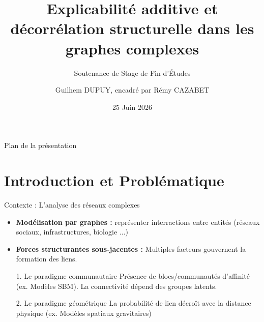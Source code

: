 \documentclass[10pt]{beamer}
\title[Explicabilité et décorrélation dans les graphes]{Explicabilité additive et décorrélation structurelle dans les graphes complexes}
\subtitle{Soutenance de Stage de Fin d'Études}
\author[Guilhem DUPUY]{Guilhem DUPUY, encadré par Rémy CAZABET}
\institute[LIRIS - équipe DM2L]{Université Lyon 1, LIRIS - équipe DM2L}
\date{25 Juin 2026}
\begin{document}
\begin{frame}
    \titlepage
\end{frame}

\begin{frame}{Plan de la présentation}
    \tableofcontents
\end{frame}

\section{Introduction et Problématique}

\begin{frame}{Contexte : L'analyse des réseaux complexes}
    \begin{itemize}
        \item \textbf{Modélisation par graphes :} représenter interractions entre entités (réseaux sociaux, infrastructures, biologie ...)
        \item \textbf{Forces structurantes sous-jacentes :} Multiples facteurs gouvernent la formation des liens.
        \begin{block}{1. Le paradigme communautaire}
            Présence de blocs/communautés d'affinité (ex. Modèles SBM). La connectivité dépend des groupes latents.
        \end{block}
        \begin{block}{2. Le paradigme géométrique}
            La probabilité de lien décroît avec la distance physique (ex. Modèles spatiaux gravitaires)
        \end{block}
    \end{itemize}
\end{frame}
\end{document}
